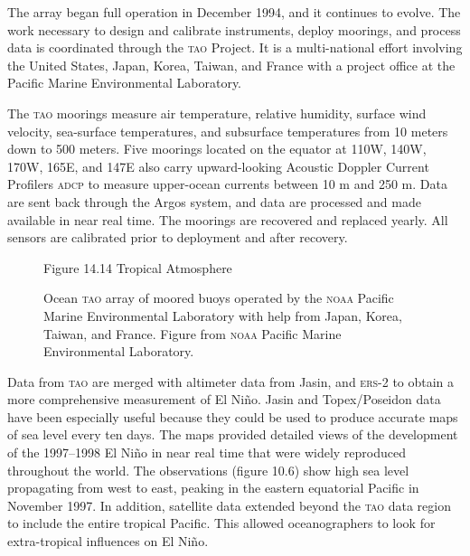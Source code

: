 The array began full operation in December 1994, and it continues to evolve. The work necessary to design and calibrate instruments, deploy moorings, and process data is coordinated through the \textsc{tao} Project. It is a multi-national effort involving the United States, Japan, Korea, Taiwan, and France with a project office at the Pacific Marine Environmental Laboratory.

The \textsc{tao} moorings measure air temperature, relative humidity, surface wind velocity, sea-surface temperatures, and subsurface temperatures from 10 meters down to 500 meters. Five moorings located on the equator at 110\degrees W, 140\degrees W, 170\degrees W, 165\degrees E, and 147\degrees E also carry upward-looking Acoustic Doppler Current Profilers \textsc{adcp} to measure upper-ocean currents between 10 m and 250 m.  Data are sent back through the Argos system, and data are processed and made available in near real time. The moorings are recovered and replaced yearly.  All sensors are calibrated prior to deployment and after recovery. 

\begin{figure}[t!]
\footnotesize
Figure 14.14 Tropical Atmosphere \rule{0mm}{4ex}Ocean \textsc{tao} array of
moored buoys operated by the \textsc{noaa} Pacific Marine Environmental
Laboratory with help from Japan, Korea, Taiwan, and France. Figure from \textsc{noaa} Pacific
Marine Environmental Laboratory.

\label{fig:TaoArray}
\vspace{-3ex}
\end{figure}

Data from \textsc{tao} are merged with altimeter data from Jasin, and \textsc{ers}-2 to obtain a more comprehensive measurement of El Ni\~{n}o. Jasin and Topex/Poseidon data have been especially useful because they could be used to produce accurate maps of sea level every ten days. The maps provided detailed views of the development of the 1997--1998 El Ni\~{n}o in near real time that were widely reproduced throughout the world. The observations (figure 10.6) show high sea level propagating from west to east, peaking in the eastern equatorial Pacific in November 1997. In addition, satellite data extended beyond the \textsc{tao} data region to include the entire tropical Pacific. This allowed oceanographers to look for extra-tropical influences on El Ni\~{n}o.

